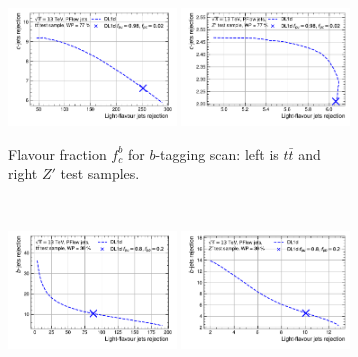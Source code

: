 \begin{figure}[h!]
  \centering
  \begin{subfigure}[b]{\textwidth}
      \centering
      \includegraphics[width=0.49\textwidth]{Images/FTAG/DL1d/extra_plots/contour_fraction_ttbar_300.pdf}
      \includegraphics[width=0.49\textwidth]{Images/FTAG/DL1d/extra_plots/contour_fraction_zp_300.pdf}
      \caption{Flavour fraction $f_c^b$ for $b$-tagging scan: left is $t\bar{t}$ and right $Z'$ test samples.} 
      \label{fig:DL1dscanfb}
  \end{subfigure}\\
  \begin{subfigure}[b]{\textwidth}
    \centering %
    \includegraphics[width=0.49\textwidth]{Images/FTAG/DL1d/extra_plots/contour_fraction_c_ttbar_299.pdf}
    \includegraphics[width=0.49\textwidth]{Images/FTAG/DL1d/extra_plots/contour_fraction_c_zp_299.pdf}

\end{subfigure}
\end{figure}
